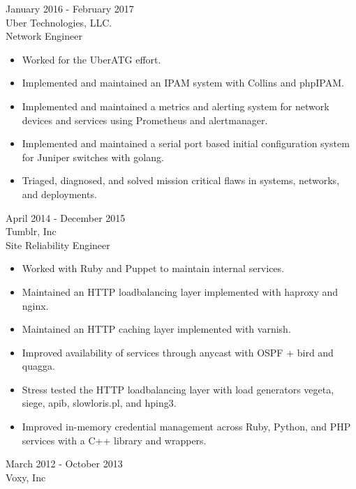\documentclass[a4paper]{article}
\begin{document}
        \begin{multicols}{3}
            \noindent
            January 2016 - February 2017 \\
            Uber Technologies, LLC. \\
            Network Engineer \\
            \begin{itemize}
                \item Worked for the UberATG effort.
                \item Implemented and maintained an IPAM system with Collins and phpIPAM.
                \item Implemented and maintained a metrics and alerting system for network devices and services using Prometheus and alertmanager.
                \item Implemented and maintained a serial port based initial configuration system for Juniper switches with golang.
                \item Triaged, diagnosed, and solved mission critical flaws in systems, networks, and deployments.
            \end{itemize}
            \columnbreak
            April 2014 - December 2015 \\
            Tumblr, Inc \\
            Site Reliability Engineer \\
            \begin{itemize}
                \item Worked with Ruby and Puppet to maintain internal services.
                \item Maintained an HTTP loadbalancing layer implemented with haproxy and nginx.
                \item Maintained an HTTP caching layer implemented with varnish.
                \item Improved availability of services through anycast with OSPF + bird and quagga.
                \item Stress tested the HTTP loadbalancing layer with load generators vegeta, siege, apib, slowloris.pl, and hping3.
                \item Improved in-memory credential management across Ruby, Python, and PHP services with a C++ library and wrappers.
            \end{itemize}
            \columnbreak
            March 2012 - October 2013 \\
            Voxy, Inc \\

\end{multicols}
\end{document}
